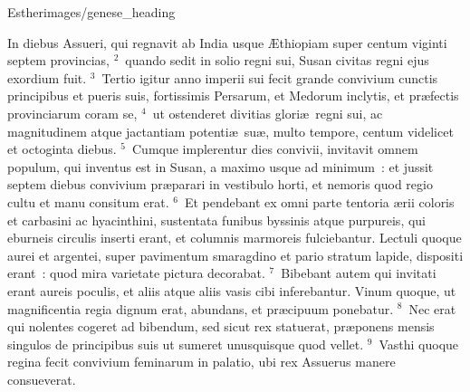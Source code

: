 {Esther}{images/genese_heading}


\lettrine[lines=6,image=true,loversize=0.05,lraise=-0.03]{I}{}n diebus Assueri, qui regnavit ab India usque \AE thiopiam super centum viginti septem provincias,
${}^{2}$~quando sedit in solio regni sui, Susan civitas regni ejus exordium fuit.
${}^{3}$~Tertio igitur anno imperii sui fecit grande convivium cunctis principibus et pueris suis, fortissimis Persarum, et Medorum inclytis, et pr\ae fectis provinciarum coram se,
${}^{4}$~ut ostenderet divitias glori\ae\ regni sui, ac magnitudinem atque jactantiam potenti\ae\ su\ae , multo tempore, centum videlicet et octoginta diebus.
${}^{5}$~Cumque implerentur dies convivii, invitavit omnem populum, qui inventus est in Susan, a maximo usque ad minimum~: et jussit septem diebus convivium pr\ae parari in vestibulo horti, et nemoris quod regio cultu et manu consitum erat.
${}^{6}$~Et pendebant ex omni parte tentoria \ae rii coloris et carbasini ac hyacinthini, sustentata funibus byssinis atque purpureis, qui eburneis circulis inserti erant, et columnis marmoreis fulciebantur. Lectuli quoque aurei et argentei, super pavimentum smaragdino et pario stratum lapide, dispositi erant~: quod mira varietate pictura decorabat.
${}^{7}$~Bibebant autem qui invitati erant aureis poculis, et aliis atque aliis vasis cibi inferebantur. Vinum quoque, ut magnificentia regia dignum erat, abundans, et pr\ae cipuum ponebatur.
${}^{8}$~Nec erat qui nolentes cogeret ad bibendum, sed sicut rex statuerat, pr\ae ponens mensis singulos de principibus suis ut sumeret unusquisque quod vellet.
${}^{9}$~Vasthi quoque regina fecit convivium feminarum in palatio, ubi rex Assuerus manere consueverat.


